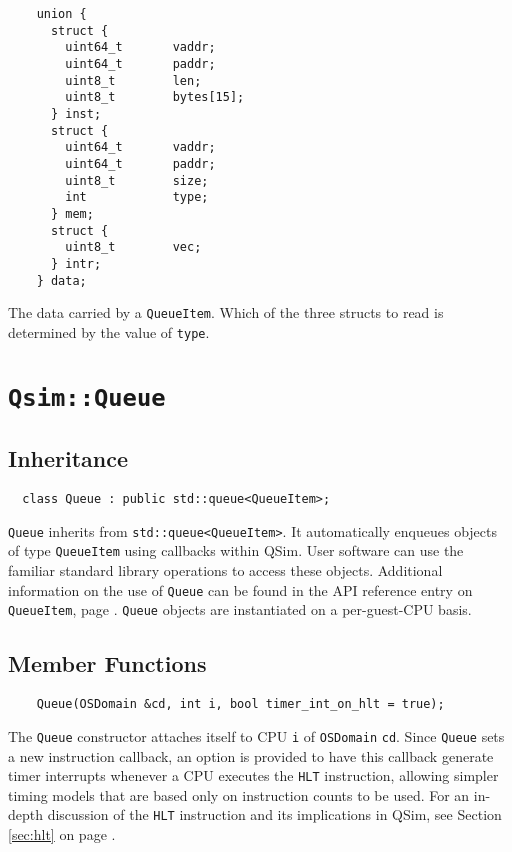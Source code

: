 \documentclass[letterpaper, 10pt]{book}
\begin{document}
\begin{verbatim}
    union {
      struct {
        uint64_t       vaddr;
        uint64_t       paddr;
        uint8_t        len;
        uint8_t        bytes[15];
      } inst;
      struct {
        uint64_t       vaddr;
        uint64_t       paddr;
        uint8_t        size;
        int            type;
      } mem;
      struct {
        uint8_t        vec;
      } intr;
    } data;
\end{verbatim}
The data carried by a \texttt{QueueItem}. Which of the three structs to read
is determined by the value of \texttt{type}.
\newpage

\section{\texttt{Qsim::Queue}} \label{class:Queue}
\subsection{Inheritance}
\begin{verbatim}
  class Queue : public std::queue<QueueItem>;
\end{verbatim}

\texttt{Queue} inherits from \texttt{std::queue<QueueItem>}. It automatically
enqueues objects of type \texttt{QueueItem} using callbacks within QSim. User
software can use the familiar standard library operations to access these 
objects. Additional information on the use of \texttt{Queue} can be found 
in the API reference entry on \texttt{QueueItem}, page 
\pageref{struct:QueueItem}. \texttt{Queue} objects are instantiated on a
per-guest-CPU basis.

\subsection{Member Functions}
\label{func:Queue} \begin{verbatim}
    Queue(OSDomain &cd, int i, bool timer_int_on_hlt = true);
\end{verbatim}
The \texttt{Queue} constructor attaches itself to CPU \texttt{i} of 
\texttt{OSDomain} \texttt{cd}. Since \texttt{Queue} sets a new instruction
callback, an option is provided to have this callback generate timer interrupts
whenever a CPU executes the \texttt{HLT} instruction, allowing simpler timing
models that are based only on instruction counts to be used. For an in-depth
discussion of the \texttt{HLT} instruction and its implications in QSim, see
Section \ref{sec:hlt} on page \pageref{sec:hlt}.
\end{document}
